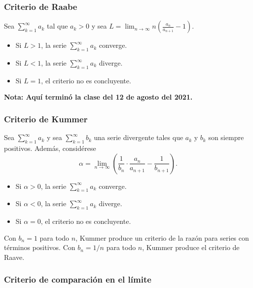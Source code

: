\documentclass{article}
\begin{document}
\subsubsection*{Criterio de Raabe}

Sea $\displaystyle \sum_{k=1}^{\infty}a_k$ tal que $a_k>0$ y sea $L=\displaystyle\lim_{n\to\infty}n\left(\frac{a_n}{a_{n+1}}-1\right)$.
\begin{itemize}

\item Si $L>1$, la serie $\displaystyle \sum_{k=1}^{\infty}a_k$ converge.

\item Si $L<1$, la serie $\displaystyle \sum_{k=1}^{\infty}a_k$ diverge.

\item Si $L=1$, el criterio no es concluyente.

\end{itemize}

\vspace{10pt}
\textbf{Nota: Aquí terminó la clase del 12 de agosto del 2021.}

\subsubsection*{Criterio de Kummer}

Sea $\displaystyle \sum_{k=1}^{\infty}a_k$ y sea $\displaystyle \sum_{k=1}^{\infty}b_k$ una serie divergente tales que $a_k$ y $b_k$ son siempre positivos. Además, considérese
$$\alpha=\lim_{n\to\infty} \left(\frac{1}{b_n}\cdot\frac{a_n}{a_{n+1}}-\frac{1}{b_{n+1}}\right).$$
\begin{itemize}

\item Si $\alpha>0$, la serie $\displaystyle \sum_{k=1}^{\infty}a_k$ converge.

\item Si $\alpha<0$, la serie $\displaystyle \sum_{k=1}^{\infty}a_k$ diverge.

\item Si $\alpha=0$, el criterio no es concluyente.

\end{itemize}
Con $b_n=1$ para todo $n$, Kummer produce un criterio de la razón para series con términos positivos. Con $b_n=1/n$ para todo $n$, Kummer produce el criterio de Raave.

\newpage
\subsubsection*{Criterio de comparación en el límite}
\end{document}
